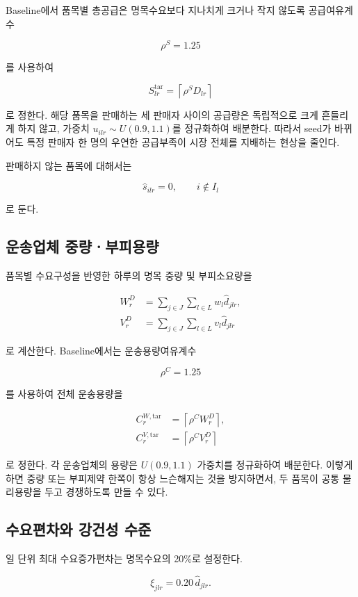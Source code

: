 \documentclass[11pt,a4paper]{article}
\begin{document}
Baseline에서 품목별 총공급은 명목수요보다 지나치게 크거나 작지 않도록
공급여유계수

\[
\rho^S=1.25
\]

를 사용하여

\[
S_{lr}^{\mathrm{tar}}=\left\lceil \rho^S D_{lr}\right\rceil
\]

로 정한다.
해당 품목을 판매하는 세 판매자 사이의 공급량은 독립적으로 크게 흔들리게 하지 않고,
가중치 $u_{ilr}\sim U(0.9,1.1)$를 정규화하여 배분한다.
따라서 seed가 바뀌어도 특정 판매자 한 명의 우연한 공급부족이 시장 전체를 지배하는 현상을 줄인다.

판매하지 않는 품목에 대해서는

\[
\hat s_{ilr}=0,\qquad i\notin I_l
\]

로 둔다.

\subsection{운송업체 중량ㆍ부피용량}

품목별 수요구성을 반영한 하루의 명목 중량 및 부피소요량을

\begin{align}
W_r^{D}&=\sum_{j\in J}\sum_{l\in L}w_l\hat d_{jlr},\\
V_r^{D}&=\sum_{j\in J}\sum_{l\in L}v_l\hat d_{jlr}
\end{align}

로 계산한다.
Baseline에서는 운송용량여유계수

\[
\rho^C=1.25
\]

를 사용하여 전체 운송용량을

\begin{align}
C_r^{W,\mathrm{tar}}&=\left\lceil\rho^C W_r^{D}\right\rceil,\\
C_r^{V,\mathrm{tar}}&=\left\lceil\rho^C V_r^{D}\right\rceil
\end{align}

로 정한다.
각 운송업체의 용량은 $U(0.9,1.1)$ 가중치를 정규화하여 배분한다.
이렇게 하면 중량 또는 부피제약 한쪽이 항상 느슨해지는 것을 방지하면서,
두 품목이 공통 물리용량을 두고 경쟁하도록 만들 수 있다.

\subsection{수요편차와 강건성 수준}

일 단위 최대 수요증가편차는 명목수요의 20\%로 설정한다.

\[
\xi_{jlr}=0.20\,\hat d_{jlr}.
\]
\end{document}
